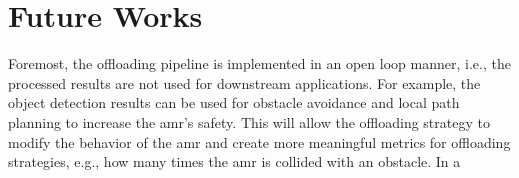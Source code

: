 \section{Future Works}\label{sec:conclusion:limitation_and_future_works}

Foremost, the offloading pipeline is implemented in an open loop manner, i.e., the processed results are not used for downstream applications. For example, the object detection results can be used for obstacle avoidance and local path planning to increase the \gls{amr}'s safety. This will allow the offloading strategy to modify the behavior of the \gls{amr} and create more meaningful metrics for offloading strategies, e.g., how many times the \gls{amr} is collided with an obstacle. In a 


